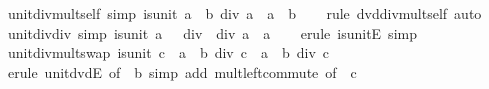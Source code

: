 \begin{isabellebody}
\endisatagproof
{\isafoldproof}%
%
\isadelimproof
\isanewline
%
\endisadelimproof
\isanewline
{}\isamarkupfalse%
\ unit{\isacharunderscore}{\kern0pt}div{\isacharunderscore}{\kern0pt}mult{\isacharunderscore}{\kern0pt}self\ {\isacharbrackleft}{\kern0pt}simp{\isacharbrackright}{\kern0pt}{\isacharcolon}{\kern0pt}\ {\isachardoublequoteopen}is{\isacharunderscore}{\kern0pt}unit\ a\ {\isasymLongrightarrow}\ b\ div\ a\ {\isacharasterisk}{\kern0pt}\ a\ {\isacharequal}{\kern0pt}\ b{\isachardoublequoteclose}\isanewline
%
\isadelimproof
\ \ %
\endisadelimproof
%
\isatagproof
{}\isamarkupfalse%
\ {\isacharparenleft}{\kern0pt}rule\ dvd{\isacharunderscore}{\kern0pt}div{\isacharunderscore}{\kern0pt}mult{\isacharunderscore}{\kern0pt}self{\isacharparenright}{\kern0pt}\ auto%
\endisatagproof
{\isafoldproof}%
%
\isadelimproof
\isanewline
%
\endisadelimproof
\isanewline
{}\isamarkupfalse%
\ unit{\isacharunderscore}{\kern0pt}div{\isacharunderscore}{\kern0pt}{}{\isacharunderscore}{\kern0pt}div{\isacharunderscore}{\kern0pt}{}\ {\isacharbrackleft}{\kern0pt}simp{\isacharbrackright}{\kern0pt}{\isacharcolon}{\kern0pt}\ {\isachardoublequoteopen}is{\isacharunderscore}{\kern0pt}unit\ a\ {\isasymLongrightarrow}\ {}\ div\ {\isacharparenleft}{\kern0pt}{}\ div\ a{\isacharparenright}{\kern0pt}\ {\isacharequal}{\kern0pt}\ a{\isachardoublequoteclose}\isanewline
%
\isadelimproof
\ \ %
\endisadelimproof
%
\isatagproof
{}\isamarkupfalse%
\ {\isacharparenleft}{\kern0pt}erule\ is{\isacharunderscore}{\kern0pt}unitE{\isacharparenright}{\kern0pt}\ simp%
\endisatagproof
{\isafoldproof}%
%
\isadelimproof
\isanewline
%
\endisadelimproof
\isanewline
{}\isamarkupfalse%
\ unit{\isacharunderscore}{\kern0pt}div{\isacharunderscore}{\kern0pt}mult{\isacharunderscore}{\kern0pt}swap{\isacharcolon}{\kern0pt}\ {\isachardoublequoteopen}is{\isacharunderscore}{\kern0pt}unit\ c\ {\isasymLongrightarrow}\ a\ {\isacharasterisk}{\kern0pt}\ {\isacharparenleft}{\kern0pt}b\ div\ c{\isacharparenright}{\kern0pt}\ {\isacharequal}{\kern0pt}\ {\isacharparenleft}{\kern0pt}a\ {\isacharasterisk}{\kern0pt}\ b{\isacharparenright}{\kern0pt}\ div\ c{\isachardoublequoteclose}\isanewline
%
\isadelimproof
\ \ %
\endisadelimproof
%
\isatagproof
{}\isamarkupfalse%
\ {\isacharparenleft}{\kern0pt}erule\ unit{\isacharunderscore}{\kern0pt}dvdE\ {\isacharbrackleft}{\kern0pt}of\ {\isacharunderscore}{\kern0pt}\ b{\isacharbrackright}{\kern0pt}{\isacharparenright}{\kern0pt}\ {\isacharparenleft}{\kern0pt}simp\ add{\isacharcolon}{\kern0pt}\ mult{\isachardot}{\kern0pt}left{\isacharunderscore}{\kern0pt}commute\ {\isacharbrackleft}{\kern0pt}of\ {\isacharunderscore}{\kern0pt}\ c{\isacharbrackright}{\kern0pt}{\isacharparenright}{\kern0pt}%

\end{isabellebody}
